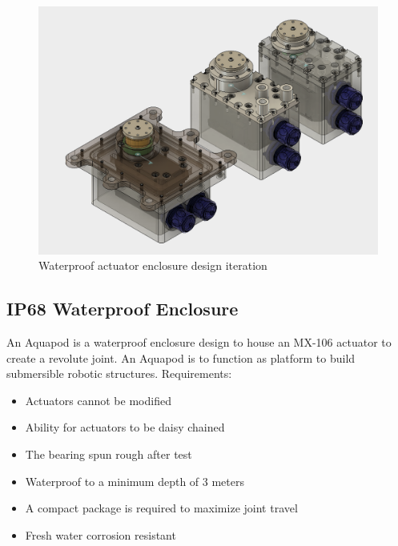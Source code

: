 \begin{figure}[h]
\centering
\includegraphics[width=1.0\columnwidth]{./img/aquaPod-evolution.png}
\caption{Waterproof actuator enclosure design iteration }
\label{fig:pod evolution}
\end{figure}


\subsection{IP68 Waterproof Enclosure}
An Aquapod is a waterproof enclosure design to house an MX-106 actuator to create a revolute joint. An Aquapod is to function as platform to build submersible robotic structures.
Requirements: 
\begin{itemize}
    \item Actuators cannot be modified 
    
    \item Ability for actuators to be daisy chained

    \item The bearing spun rough after test

    \item Waterproof to a minimum depth of 3 meters

    \item A compact package is required to maximize joint travel

    \item Fresh water corrosion resistant
    
\end{itemize}


